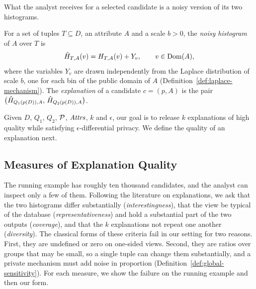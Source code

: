 What the analyst receives for a selected candidate is a noisy version of its two histograms.

\begin{definition}[Explanation]
\label{def:noisy-histogram}
For a set of tuples $T\subseteq D$, an attribute $A$ and a scale $b>0$, the \emph{noisy histogram} of $A$ over $T$ is
\[
\hat H_{T,A}(v)=H_{T,A}(v)+Y_v,\qquad v\in\operatorname{Dom}(A),
\]
where the variables $Y_v$ are drawn independently from the Laplace distribution of scale $b$, one for each bin of the public domain of $A$ (Definition~\ref{def:laplace-mechanism}).
The \emph{explanation} of a candidate $c=(p,A)$ is the pair $\big(\hat H_{Q_1(p(D)),A},\,\hat H_{Q_2(p(D)),A}\big)$.
\end{definition}

Given $D$, $Q_1$, $Q_2$, $\mathcal{P}$, $\mathit{Attrs}$, $k$ and $\epsilon$, our goal is to release $k$ explanations of high quality while satisfying $\epsilon$-differential privacy.
We define the quality of an explanation next.


\subsection{Measures of Explanation Quality}
\label{sec:explanation-quality}

The running example has roughly ten thousand candidates, and the analyst can inspect only a few of them.
Following the literature on explanations, we ask that the two histograms differ substantially (\emph{interestingness}), that the view be typical of the database (\emph{representativeness}) and hold a substantial part of the two outputs (\emph{coverage}), and that the $k$ explanations not repeat one another (\emph{diversity}).
The classical forms of these criteria fail in our setting for two reasons.
First, they are undefined or zero on one-sided views.
Second, they are ratios over groups that may be small, so a single tuple can change them substantially, and a private mechanism must add noise in proportion (Definition~\ref{def:global-sensitivity}).
For each measure, we show the failure on the running example and then our form.

